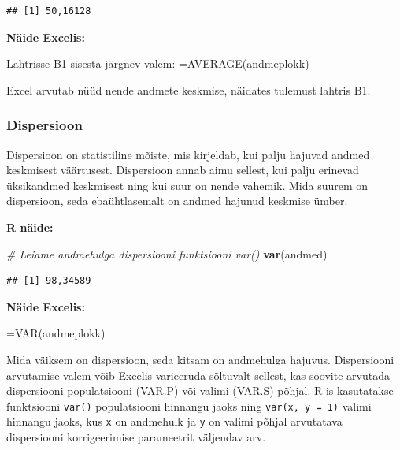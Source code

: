 \documentclass[
]{book}
\newenvironment{Shaded}{\begin{snugshade}}{\end{snugshade}}
\newcommand{\CommentTok}[1]{\textcolor[rgb]{0.56,0.35,0.01}{\textit{#1}}}
\newcommand{\FunctionTok}[1]{\textcolor[rgb]{0.13,0.29,0.53}{\textbf{#1}}}
\newcommand{\NormalTok}[1]{#1}
\renewenvironment{Shaded} {\begin{snugshade}\footnotesize} {\end{snugshade}}
\begin{document}
\begin{verbatim}
## [1] 50,16128
\end{verbatim}

\textbf{Näide Excelis:}

\begin{Shaded}
\begin{Highlighting}[]
\NormalTok{Lahtrisse B1 sisesta järgnev valem: \textasciigrave{}=AVERAGE(andmeplokk)\textasciigrave{}}
\end{Highlighting}
\end{Shaded}

Excel arvutab nüüd nende andmete keskmise, näidates tulemust lahtris B1.

\subsubsection{Dispersioon}\label{dispersioon}

Dispersioon on statistiline mõiste, mis kirjeldab, kui palju hajuvad andmed keskmisest väärtusest. Dispersioon annab aimu sellest, kui palju erinevad üksikandmed keskmisest ning kui suur on nende vahemik. Mida suurem on dispersioon, seda ebaühtlasemalt on andmed hajunud keskmise ümber.

\textbf{R näide:}

\begin{Shaded}
\begin{Highlighting}[]
\CommentTok{\# Leiame andmehulga dispersiooni funktsiooni var()}
\FunctionTok{var}\NormalTok{(andmed)}
\end{Highlighting}
\end{Shaded}

\begin{verbatim}
## [1] 98,34589
\end{verbatim}

\textbf{Näide Excelis:}

\begin{Shaded}
\begin{Highlighting}[]
\NormalTok{\textasciigrave{}=VAR(andmeplokk)\textasciigrave{}}
\end{Highlighting}
\end{Shaded}

Mida väiksem on dispersioon, seda kitsam on andmehulga hajuvus. Dispersiooni arvutamise valem võib Excelis varieeruda sõltuvalt sellest, kas soovite arvutada dispersiooni populatsiooni (VAR.P) või valimi (VAR.S) põhjal. R-is kasutatakse funktsiooni \texttt{var()} populatsiooni hinnangu jaoks ning \texttt{var(x,\ y\ =\ 1)} valimi hinnangu jaoks, kus \texttt{x} on andmehulk ja \texttt{y} on valimi põhjal arvutatava dispersiooni korrigeerimise parameetrit väljendav arv.
\end{document}
